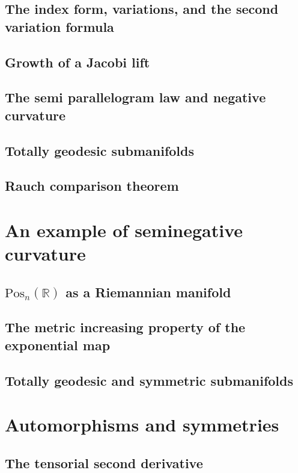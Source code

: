 \documentclass[a4paper]{article}
\newcommand{\R}{\mathbb{R}}
\begin{document}
\subsection{The index form, variations, and the second variation formula}

\subsection{Growth of a Jacobi lift}

\subsection{The semi parallelogram law and negative curvature}

\subsection{Totally geodesic submanifolds}

\subsection{Rauch comparison theorem}

\section{An example of seminegative curvature}

\subsection{$\text{Pos}_n(\R)$ as a Riemannian manifold}

\subsection{The metric increasing property of the exponential map}

\subsection{Totally geodesic and symmetric submanifolds}

\section{Automorphisms and symmetries}

\subsection{The tensorial second derivative}
\end{document}
